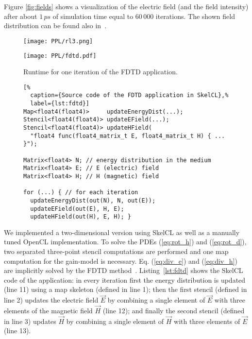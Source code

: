 Figure \ref{fig:fields} shows a visualization of the electric field (and the field intensity) after about  $1\,ps$ of simulation time equal to $60\,000$ iterations.
The shown field distribution can be found also in~\cite{Cao2000, Sebbah2002, Yamilov2005}.%

\begin{figure}[t]
	\begin{minipage}[b]{.48\textwidth}
    \centering
	  \texttt{[image: PPL/rl3.png]}
  	\caption{\small The image shows a 3D representation of the intensity for the 2D electric field as computed by the SkelCL FDTD implementation after $60\,000$ iterations.}
	  \label{fig:fields}
  \end{minipage}
  \hspace{.02\textwidth}
  \begin{minipage}[b]{.48\textwidth}
    \centering
	  \texttt{[image: PPL/fdtd.pdf]}
  	\caption{\small Runtime for one iteration of the FDTD application.}
  	\label{fig:fdtd_eval}
  \end{minipage}
  \bigskip
\end{figure}

\begin{figure}[tbp]
\begin{lstlisting}[%
  caption={Source code of the FDTD application in SkelCL},%
  label={lst:fdtd}]
Map<float4(float4)>     updateEnergyDist(...);
Stencil<float4(float4)> updateEField(...);
Stencil<float4(float4)> updateHField(
  "float4 func(float4_matrix_t E, float4_matrix_t H) { ... }");

Matrix<float4> N; // energy distribution in the medium
Matrix<float4> E; // E (electric) field
Matrix<float4> H; // H (magnetic) field

for (...) { // for each iteration
  updateEnergyDist(out(N), N, out(E));  
  updateEField(out(E), H, E);
  updateHField(out(H), E, H); }
\end{lstlisting}
\end{figure}

We implemented a two-dimensional version using SkelCL as well as a manually tuned OpenCL implementation.
To solve the PDEs (\ref{eq:rot_h}) and (\ref{eq:rot_d}), two separated three-point stencil computations are performed and one map computation for the gain-model is necessary.
Eq. (\ref{eq:div_e}) and (\ref{eq:div_h}) are implicitly solved by the FDTD method~\cite{Yee1966}.
Listing~\ref{lst:fdtd} shows the SkelCL code of the application:
in every iteration first the energy distribution is updated (line 11) using a map skeleton (defined in line 1);
then the first stencil (defined in line 2) updates the electric field $\vec{E}$ by combining a single element of $\vec{E}$ with three elements of the magnetic field $\vec{H}$ (line 12);
and finally the second stencil (defined in line 3) updates $\vec{H}$ by combining a single element of $\vec{H}$ with three elements of $\vec{E}$ (line 13).

